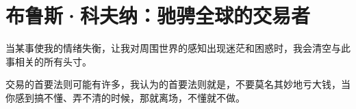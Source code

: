 \chapter{布鲁斯·科夫纳：驰骋全球的交易者}
当某事使我的情绪失衡，让我对周围世界的感知出现迷茫和困惑时，我会清空与此事相关的所有头寸。

交易的首要法则可能有许多，我认为的首要法则就是，不要莫名其妙地亏大钱，当你感到搞不懂、弄不清的时候，那就离场，不懂就不做。